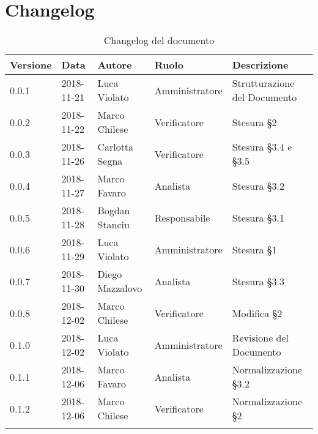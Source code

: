 \section{Changelog}

\begin{center}
\begin{longtable}[c]{|m{}|m{}|m{}|m{}|p{}|}
\hline
\textbf{Versione} & \textbf{Data} & \textbf{Autore} & \textbf{Ruolo} & \textbf{Descrizione} \\
\hline \hline
\endfirsthead
0.0.1 & 2018-11-21 & Luca Violato & Amministratore & Strutturazione del Documento \\
\hline
0.0.2 & 2018-11-22 & Marco Chilese & Verificatore & Stesura §2 \\
\hline
0.0.3 & 2018-11-26 & Carlotta Segna & Verificatore & Stesura §3.4 e §3.5 \\
\hline
0.0.4 & 2018-11-27 & Marco Favaro & Analista & Stesura §3.2 \\
\hline
0.0.5 & 2018-11-28 & Bogdan Stanciu & Responsabile & Stesura §3.1\\
\hline
0.0.6 & 2018-11-29 & Luca Violato & Amministratore & Stesura §1 \\
\hline
0.0.7 & 2018-11-30 & Diego Mazzalovo & Analista & Stesura §3.3 \\
\hline
0.0.8 & 2018-12-02 & Marco Chilese & Verificatore & Modifica §2 \\
\hline
0.1.0 & 2018-12-02 & Luca Violato & Amministratore & Revisione del Documento\\
\hline
0.1.1 & 2018-12-06 & Marco Favaro & Analista & Normalizzazione §3.2\\
\hline
0.1.2 & 2018-12-06 & Marco Chilese & Verificatore & Normalizzazione §2\\
\caption{Changelog del documento}
\end{longtable}
\end{center}
